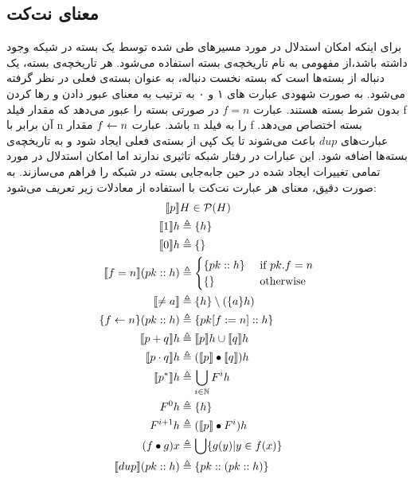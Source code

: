 \subsection{معنای نت‌کت}
برای اینکه امکان استدلال در مورد مسیر‌های طی شده توسط یک بسته‌ در شبکه وجود داشته باشد،از مفهومی به نام تاریخچه‌ی بسته
استفاده می‌شود.
هر تاریخچه‌ی بسته‌، یک دنباله از بسته‌ها است که بسته نخست دنباله، به عنوان بسته‌ی فعلی در نظر گرفته می‌شود.
به صورت شهودی
عبارت های ۱ و ۰ به ترتیب به معنای عبور دادن
و رها کردن
 بدون شرط بسته هستند.
عبارت
$f=n$
در صورتی بسته را عبور می‌دهد که مقدار فیلد
f
آن برابر با
n
باشد.
عبارت
$f \leftarrow n$
مقدار n
را به فیلد f
بسته اختصاص
 می‌دهد.
 عبارت‌های
 $dup$
باعث می‌شوند تا یک کپی از بسته‌ی فعلی ایجاد شود و به تاریخچه‌ی بسته‌ها اضافه شود.
این عبارات در رفتار شبکه تاثیری ندارند اما امکان استدلال در مورد تمامی تغییرات ایجاد شده در حین جا‌به‌جایی بسته در شبکه را فراهم می‌سازند.
 به صورت دقیق، معنای هر عبارت
 نت‌کت با استفاده از معادلات زیر تعریف می‌شود:
\begin{align*}
    \llbracket p \rrbracket             & H \in \mathcal{P}({H})                \\
    \llbracket 1 \rrbracket h           & \triangleq \{h\}                            \\
    \llbracket 0 \rrbracket h           & \triangleq \{\}                             \\
    \llbracket f=n \rrbracket(pk::h)    & \triangleq \begin{cases}
                                   \{pk::h\} & \text{ if } pk.f = n \\
                                   \{\}      & \text{ otherwise }
                               \end{cases} \\
    \llbracket \neq a \rrbracket        & \triangleq \{h\} \setminus (\{a\}h)         \\
    \{f \leftarrow n\} (pk::h) & \triangleq \{pk[f:=n]::h\}                  \\
    \llbracket p+q \rrbracket h          & \triangleq \llbracket p \rrbracket h \cup \llbracket q \rrbracket h           \\
    \llbracket p\cdot q \rrbracket h    & \triangleq (\llbracket p \rrbracket \bullet \llbracket q \rrbracket) h      \\
    \llbracket p^* \rrbracket h          & \triangleq \bigcup_{i \in \mathbb{N}}F^i h  \\
    F^0 h               & \triangleq \{h\}                            \\
    F^{i+1} h           & \triangleq (\llbracket p \rrbracket \bullet F^i) h          \\
    (f \bullet g) x     & \triangleq \bigcup\{g(y)|y \in f(x)\}       \\
    \llbracket dup \rrbracket (pk::h)   & \triangleq \{pk::(pk::h)\}
\end{align*}
